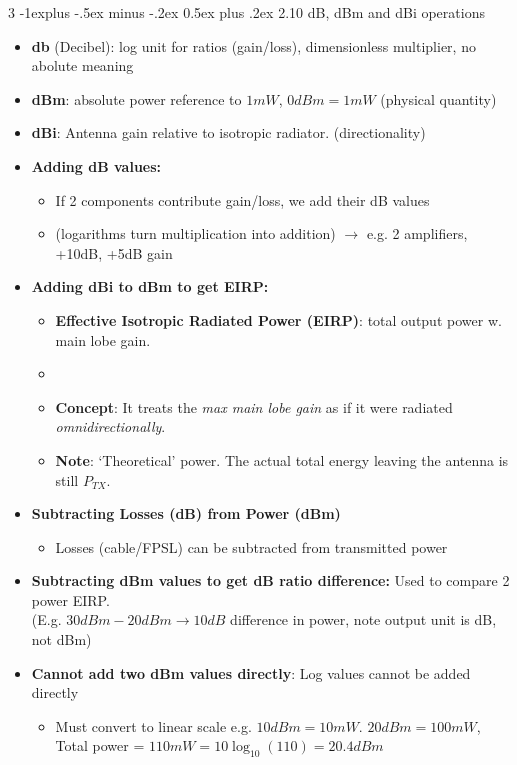 \documentclass[a4paper, 9pt, landscape]{extarticle}
\makeatletter
\renewcommand{\subsection}{\@startsection{subsection}{2}{0mm}%
                                {-1explus -.5ex minus -.2ex}%
                                {0.5ex plus .2ex}%
                                {\normalfont\normalsize\bfseries}}
\makeatother
\begin{document}
\begin{multicols*}{3}
\subsection{2.10 dB, dBm and dBi operations}
\begin{itemize}
  \item \textbf{db} (Decibel): log unit for ratios (gain/loss), dimensionless multiplier, no abolute meaning
  \item \textbf{dBm}: absolute power reference to $1mW$, $0 dBm = 1mW$ (physical quantity)
  \item \textbf{dBi}: Antenna gain relative to isotropic radiator. (directionality)
  \item \textbf{Adding dB values:}
  \begin{itemize}
    \item If 2 components contribute gain/loss, we add their dB values 
    \item (logarithms turn multiplication into addition) $\rightarrow$ e.g. 2 amplifiers, +10dB, +5dB gain
  \end{itemize}
  \item \textbf{Adding dBi to dBm to get EIRP:}
  \begin{itemize}
    \item \textbf{Effective Isotropic Radiated Power (EIRP)}: total output power w. main lobe gain.
    \item {}
    \item \textbf{Concept}: It treats the \textit{max main lobe gain} as if it were radiated \textit{omnidirectionally}.
    \item \textbf{Note}: `Theoretical' power. The actual total energy leaving the antenna is still $P_{TX}$.
  \end{itemize}
  \item \textbf{Subtracting Losses (dB) from Power (dBm)}
  \begin{itemize}
    \item Losses (cable/FPSL) can be subtracted from transmitted power
  \end{itemize}
  \item \textbf{Subtracting dBm values to get dB ratio difference:} Used to compare 2 power EIRP.\\
   (E.g. $30 dBm - 20 dBm \rightarrow 10 dB$ difference in power, note output unit is dB, not dBm)
  \item \textbf{Cannot add two dBm values directly}: Log values cannot be added directly
  \begin{itemize}
    \item Must convert to linear scale e.g. $10 dBm = 10mW$. $20 dBm = 100 mW$, Total power = $110 mW = 10\log_{10}(110) = 20.4 dBm$
  \end{itemize}
\end{itemize}


\end{multicols*}
\end{document}
